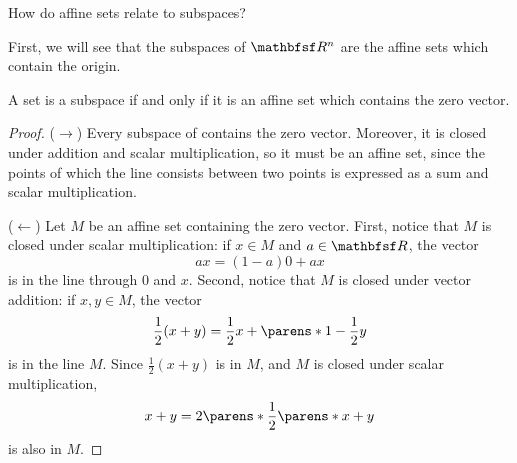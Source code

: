 
\sbasic































\sstart
{}


How do affine sets relate to subspaces?


First, we will see that the subspaces of $\R^n$ are the affine sets which contain the origin.

\begin{prop}

A set is a subspace if and only if it is an affine set which contains the zero vector.

\begin{proof}

($\rightarrow$) Every subspace of contains the zero vector. Moreover, it is closed under addition and scalar multiplication, so it must be an affine set, since the points of which the line consists between two points is expressed as a sum and scalar multiplication.

($\leftarrow$) Let $M$ be an affine set containing the zero vector. First, notice that $M$ is closed under scalar multiplication: if $x \in M$ and $a \in \R$, the vector
$$
  ax = (1 - a)0 + ax
$$
is in the line through $0$ and $x$.
Second, notice that $M$ is closed under vector addition: if $x, y \in M$, the vector
$$
  \frac{1}{2}(x + y) = \frac{1}{2}x + \parens*{1 - \frac{1}{2}}y
$$
is in the line $M$.
  Since $\frac{1}{2}(x + y)$ is in $M$, and $M$ is closed under scalar multiplication,
$$
  x + y = 2\parens*{\frac{1}{2}\parens*{x + y}}
$$
is also in $M$.

\end{proof}

\end{prop}

